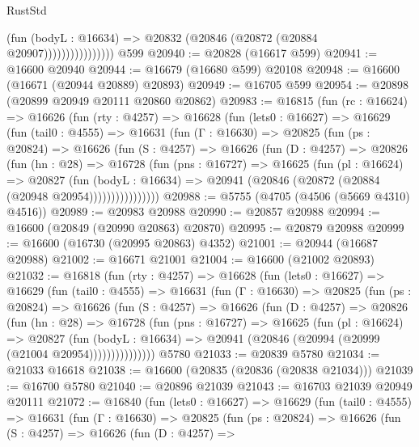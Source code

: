 \begin{lexlean}{RustStd}
\begin{coremodule}
{\begin{coremodule}
{{{{{{{{{{{{{{{{{{{{{{{{{{{{{{{{{{{{{{{{{{{{{{{{{{{{{{{                            (fun (bodyL : @16634) =>
                            @20832 (@20846 (@20872 (@20884 @20907))))))))))))))))
    @599
@20940 := @20828 (@16617 @599)
@20941 := @16600 @20940
@20944 := @16679 (@16680 @599) @20108
@20948 := @16600 (@16671 (@20944 @20889) @20893)
@20949 := @16705 @599
@20954 := @20898 (@20899 @20949 @20111 @20860 @20862)
@20983 := @16815
    (fun (rc : @16624) =>
    @16626
      (fun (rty : @4257) =>
      @16628
        (fun (lets0 : @16627) =>
        @16629
          (fun (tail0 : @4555) =>
          @16631
            (fun (Γ : @16630) =>
            @20825
              (fun (ps : @20824) =>
              @16626
                (fun (S : @4257) =>
                @16626
                  (fun (D : @4257) =>
                  @20826
                    (fun (hn : @28) =>
                    @16728
                      (fun (pns : @16727) =>
                      @16625
                        (fun (pl : @16624) =>
                        @20827
                          (fun (bodyL : @16634) =>
                          @20941 (@20846 (@20872 (@20884 (@20948 @20954))))))))))))))))
@20988 := @5755 (@4705 (@4506 (@5669 @4310) @4516))
@20989 := @20983 @20988
@20990 := @20857 @20988
@20994 := @16600 (@20849 (@20990 @20863) @20870)
@20995 := @20879 @20988
@20999 := @16600 (@16730 (@20995 @20863) @4352)
@21001 := @20944 (@16687 @20988)
@21002 := @16671 @21001
@21004 := @16600 (@21002 @20893)
@21032 := @16818
    (fun (rty : @4257) =>
    @16628
      (fun (lets0 : @16627) =>
      @16629
        (fun (tail0 : @4555) =>
        @16631
          (fun (Γ : @16630) =>
          @20825
            (fun (ps : @20824) =>
            @16626
              (fun (S : @4257) =>
              @16626
                (fun (D : @4257) =>
                @20826
                  (fun (hn : @28) =>
                  @16728
                    (fun (pns : @16727) =>
                    @16625
                      (fun (pl : @16624) =>
                      @20827
                        (fun (bodyL : @16634) =>
                        @20941 (@20846 (@20994 (@20999 (@21004 @20954)))))))))))))))
    @5780
@21033 := @20839 @5780
@21034 := @21033 @16618
@21038 := @16600 (@20835 (@20836 (@20838 @21034)))
@21039 := @16700 @5780
@21040 := @20896 @21039
@21043 := @16703 @21039 @20949 @20111
@21072 := @16840
    (fun (lets0 : @16627) =>
    @16629
      (fun (tail0 : @4555) =>
      @16631
        (fun (Γ : @16630) =>
        @20825
          (fun (ps : @20824) =>
          @16626
            (fun (S : @4257) =>
            @16626
              (fun (D : @4257) =>
}}}}}}}}}}}}}}}}}}}}}}}}}}}}}}}}}}}}}}}}}}}}}}}}}}}}}}}
\end{coremodule}}
\end{coremodule}
\end{lexlean}

